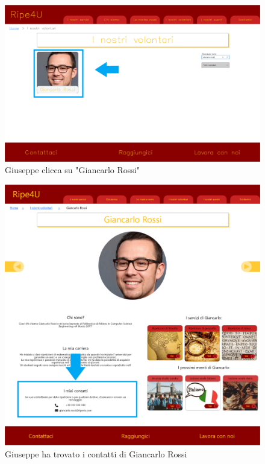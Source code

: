     \begin{figure}[H]
        \centering
        \includegraphics[scale=0.25]{resources/images/scenario3-3.png}
        \caption{Giuseppe clicca su "Giancarlo Rossi"}
    \end{figure}
    \begin{figure}[H]
        \centering
        \includegraphics[scale=0.25]{resources/images/scenario3-4.png}
        \caption{Giuseppe ha trovato i contatti di Giancarlo Rossi}
    \end{figure}
 